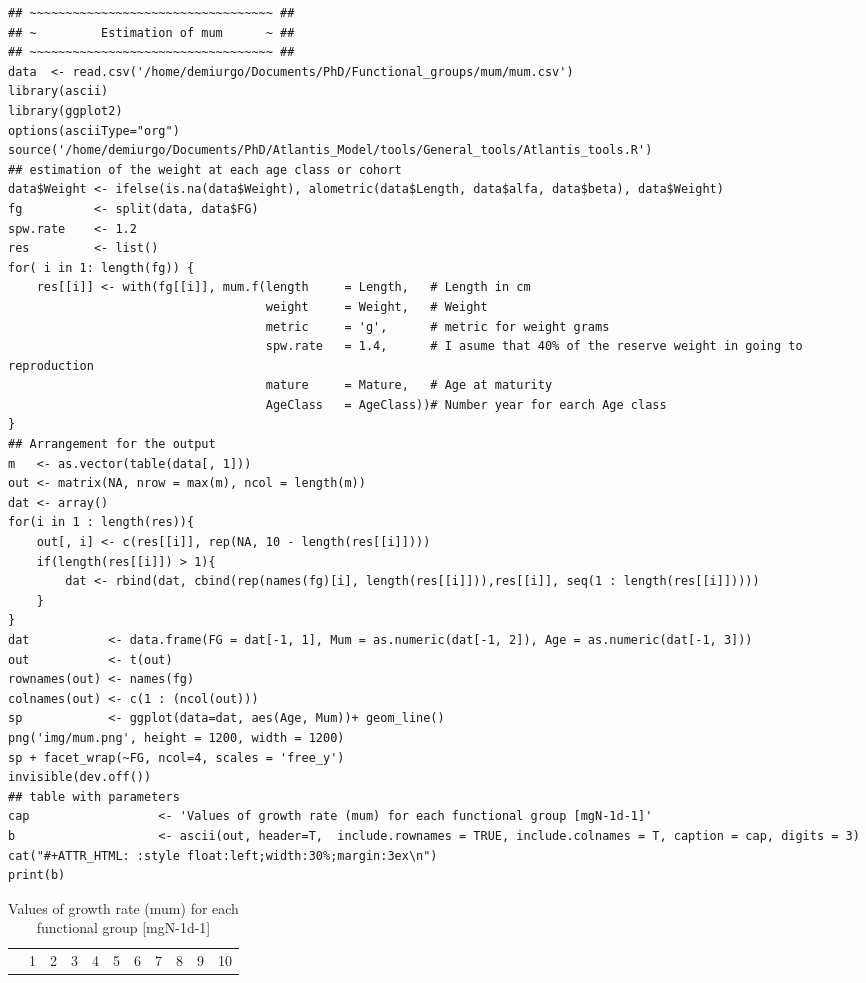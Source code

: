 \documentclass[11pt]{article}
\begin{document}
\begin{itemize}
\begin{itemize}
\begin{verbatim}
## ~~~~~~~~~~~~~~~~~~~~~~~~~~~~~~~~~~ ##
## ~         Estimation of mum      ~ ##
## ~~~~~~~~~~~~~~~~~~~~~~~~~~~~~~~~~~ ##
data  <- read.csv('/home/demiurgo/Documents/PhD/Functional_groups/mum/mum.csv')
library(ascii)
library(ggplot2)
options(asciiType="org")
source('/home/demiurgo/Documents/PhD/Atlantis_Model/tools/General_tools/Atlantis_tools.R')
## estimation of the weight at each age class or cohort
data$Weight <- ifelse(is.na(data$Weight), alometric(data$Length, data$alfa, data$beta), data$Weight)
fg          <- split(data, data$FG)
spw.rate    <- 1.2
res         <- list()
for( i in 1: length(fg)) {
    res[[i]] <- with(fg[[i]], mum.f(length     = Length,   # Length in cm
                                    weight     = Weight,   # Weight
                                    metric     = 'g',      # metric for weight grams
                                    spw.rate   = 1.4,      # I asume that 40% of the reserve weight in going to reproduction
                                    mature     = Mature,   # Age at maturity
                                    AgeClass   = AgeClass))# Number year for earch Age class
}
## Arrangement for the output
m   <- as.vector(table(data[, 1]))
out <- matrix(NA, nrow = max(m), ncol = length(m))
dat <- array()
for(i in 1 : length(res)){
    out[, i] <- c(res[[i]], rep(NA, 10 - length(res[[i]])))
    if(length(res[[i]]) > 1){
        dat <- rbind(dat, cbind(rep(names(fg)[i], length(res[[i]])),res[[i]], seq(1 : length(res[[i]]))))
    }
}
dat           <- data.frame(FG = dat[-1, 1], Mum = as.numeric(dat[-1, 2]), Age = as.numeric(dat[-1, 3]))
out           <- t(out)
rownames(out) <- names(fg)
colnames(out) <- c(1 : (ncol(out)))
sp            <- ggplot(data=dat, aes(Age, Mum))+ geom_line()
png('img/mum.png', height = 1200, width = 1200)
sp + facet_wrap(~FG, ncol=4, scales = 'free_y')
invisible(dev.off())
## table with parameters
cap                  <- 'Values of growth rate (mum) for each functional group [mgN-1d-1]'
b                    <- ascii(out, header=T,  include.rownames = TRUE, include.colnames = T, caption = cap, digits = 3)
cat("#+ATTR_HTML: :style float:left;width:30%;margin:3ex\n")
print(b)
\end{verbatim}
\begin{table}[htb]
\caption{Values of growth rate (mum) for each functional group [mgN-1d-1]}
\begin{center}
\begin{tabular}{lrrrrrrrrrr}
      &      1  &      2  &       3  &       4  &       5  &        6  &       7  &       8  &        9  &       10  \\

\end{tabular}
\end{center}
\end{table}
\end{itemize}
\end{itemize}
\end{document}
